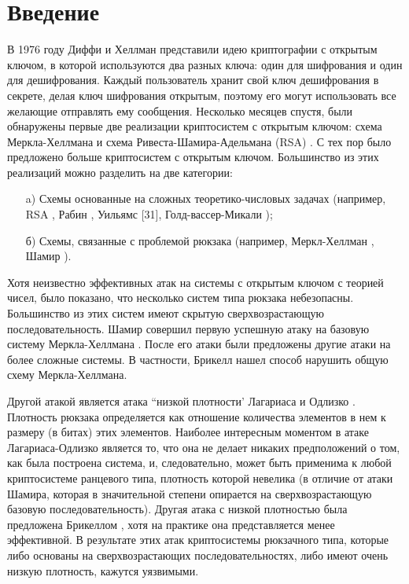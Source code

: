 \documentclass[a4paper,12pt]{article}
\begin{document}
\newpage

\section{Введение}

В 1976 году Диффи и Хеллман \cite{11} представили идею криптографии с открытым ключом, в которой используются два разных ключа: один для шифрования и один для дешифрования. Каждый пользователь хранит свой ключ дешифрования в секрете, делая ключ шифрования открытым, поэтому его могут использовать все желающие отправлять ему сообщения. Несколько месяцев спустя,
были обнаружены первые две реализации криптосистем с открытым ключом: схема Меркла-Хеллмана \cite{21} и схема Ривеста-Шамира-Адельмана (RSA) \cite{26}. С тех пор было предложено больше криптосистем с открытым ключом. Большинство из этих реализаций можно разделить на две категории:
\begin{itemize}
  \item[a)] Схемы основанные на сложных теоретико-числовых задачах (например, RSA \cite{26}, Рабин \cite{24}, Уильямс [31], Голд-вассер-Микали \cite{13});
  \item[б)] Схемы, связанные с проблемой рюкзака (например, Меркл-Хеллман \cite{21}, Шамир \cite{30}).
\end{itemize}

\noindent Хотя неизвестно эффективных атак на системы с открытым ключом с теорией чисел, было показано, что несколько систем типа рюкзака небезопасны. Большинство из этих систем имеют скрытую сверхвозрастающую последовательность. Шамир совершил первую успешную атаку на базовую систему Меркла-Хеллмана \cite{29}. После его атаки были предложены другие атаки на более сложные системы. В частности, Брикелл \cite{5} нашел способ нарушить общую схему Меркла-Хеллмана. 

Другой атакой является атака “низкой плотности’ Лагариаса и Одлизко \cite{17}. Плотность рюкзака определяется как отношение количества элементов в нем к размеру (в битах) этих элементов. Наиболее интересным моментом в атаке Лагариаса-Одлизко является то, что она не делает никаких предположений о том, как была построена система, и, следовательно, может быть применима к любой криптосистеме ранцевого типа, плотность которой невелика (в отличие от атаки Шамира, которая в значительной степени опирается на сверхвозрастающую базовую последовательность). Другая атака с низкой плотностью была предложена Брикеллом \cite{4}, хотя на практике она представляется менее эффективной. В результате этих атак криптосистемы рюкзачного типа, которые либо основаны на сверхвозрастающих последовательностях, либо имеют очень низкую плотность, кажутся уязвимыми. 
\end{document}
